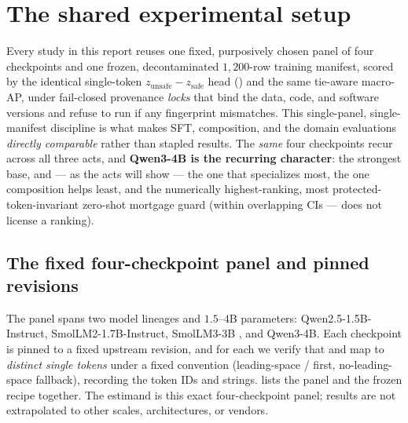 \section{The shared experimental setup}
\label{sec:setup}

Every study in this report reuses one fixed, purposively chosen panel of four checkpoints and one
frozen, decontaminated $1{,}200$-row training manifest, scored by the identical single-token
$z_{\text{unsafe}}-z_{\text{safe}}$ head () and the same tie-aware macro-AP, under
fail-closed provenance \emph{locks} that bind the data, code, and software versions and refuse to run
if any fingerprint mismatches. This single-panel, single-manifest discipline is what makes SFT,
composition, and the domain evaluations \emph{directly comparable} rather than stapled
results. The \emph{same} four checkpoints recur across all three acts, and \textbf{Qwen3-4B is the
recurring character}: the strongest base, and --- as the acts will show --- the one that specializes
most, the one composition helps least, and the numerically highest-ranking, most
protected-token-invariant zero-shot mortgage guard (within overlapping CIs --- 
does not license a ranking).

\subsection{The fixed four-checkpoint panel and pinned revisions}
\label{sec:setup-panel}

The panel spans two model lineages and $1.5$--$4$B parameters: Qwen2.5-1.5B-Instruct,
SmolLM2-1.7B-Instruct, SmolLM3-3B \citep{bakouch2025smollm3}, and Qwen3-4B. Each checkpoint is pinned to
a fixed upstream revision, and for each we verify that  and  map to
\emph{distinct single tokens} under a fixed convention (leading-space /
first, no-leading-space fallback), recording the token IDs and strings.  lists
the panel and the frozen recipe together. The estimand is this exact four-checkpoint panel; results are
not extrapolated to other scales, architectures, or vendors.


